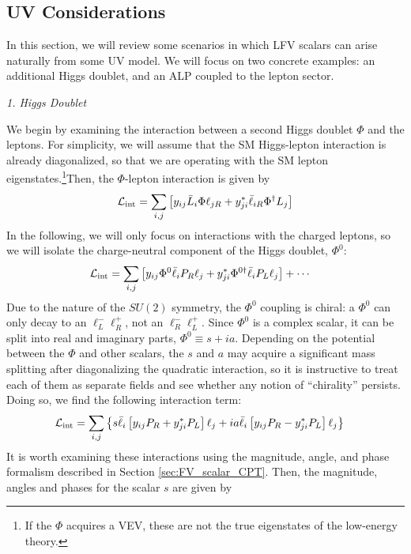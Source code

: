 \subsection{UV Considerations}\label{sec:lfv_uv}
In this section, we will review some scenarios in which LFV scalars can arise naturally from some UV model. We will focus on two concrete examples: an additional Higgs doublet, and an ALP coupled to the lepton sector.
\begin{center}
    {\it 1. Higgs Doublet}
\end{center}
We begin by examining the interaction between a second Higgs doublet $\Phi$ and the leptons. For simplicity, we will assume that the SM Higgs-lepton interaction is already diagonalized, so that we are operating with the SM lepton eigenstates.\footnote{If the $\Phi$ acquires a VEV, these are not the true eigenstates of the low-energy theory.}Then, the $\Phi$-lepton interaction is given by
\begin{align}
     {\cal L}_{\rm int} = \sum_{i,j}\left[y_{ij}\bar{L}_i \Phi \ell_{jR} + y_{ji}^*\bar{\ell}_{iR}\Phi^\dagger L_j\right]
\end{align}
In the following, we will only focus on interactions with the charged leptons, so we will isolate the charge-neutral component of the Higgs doublet, $\Phi^0$:
\begin{align}
{\cal L}_{\rm int} &= \sum_{i,j}\left[y_{ij}\Phi^0\bar{\ell}_i P_R \ell_j + y_{ji}^*\Phi^{0\dagger}\bar{\ell}_i P_L\ell_j \right] + \cdots
\end{align}
Due to the nature of the $SU(2)$ symmetry, the $\Phi^0$ coupling is chiral: a $\Phi^0$ can only decay to an $\ell_L^- \ell_R^+$, not an $\ell_R^-\ell_L^+$. Since $\Phi^0$ is a complex scalar, it can be split into real and imaginary parts, $\Phi^0 \equiv s + ia$. Depending on the potential between the $\Phi$ and other scalars, the $s$ and $a$ may acquire a significant mass splitting after diagonalizing the quadratic interaction, so it is instructive to treat each of them as separate fields and see whether any notion of ``chirality'' persists. Doing so, we find the following interaction term:
\begin{align}
{\cal L}_{\rm int} &= \sum_{i,j}\left\{s\bar{\ell}_i\left[ y_{ij}P_R  + y_{ji}^*P_L\right]\ell_j+ ia\bar{\ell}_i\left[ y_{ij}P_R  - y_{ji}^*P_L\right]\ell_j\right\}
\end{align}
It is worth examining these interactions using the magnitude, angle, and phase formalism described in Section \ref{sec:FV_scalar_CPT}. Then, the magnitude, angles and phases for the scalar $s$ are given by
